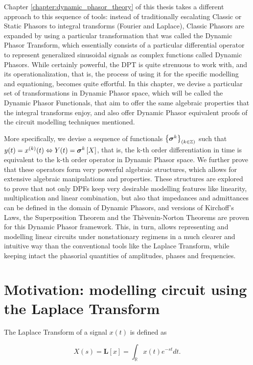 	Chapter \ref{chapter:dynamic_phasor_theory} of this thesis takes a different approach to this sequence of tools: instead of traditionally escalating Classic or Static Phasors to integral transforms (Fourier and Laplace), Classic Phasors are expanded by using a particular transformation that was called the Dynamic Phasor Transform, which essentially consists of a particular differential operator to represent generalized sinusoidal signals as complex functions called Dynamic Phasors. While certainly powerful, the DPT is quite strenuous to work with, and its operationalization, that is, the process of using it for the specific modelling and equationing, becomes quite effortful. In this chapter, we devise a particular set of transformations in Dynamic Phasor space, which will be called the Dynamic Phasor Functionals, that aim to offer the same algebraic properties that the integral transforms enjoy, and also offer Dynamic Phasor equivalent proofs of the circuit modelling techniques mentioned.

	More specifically, we devise a sequence of functionals $\left\{\boldsymbol{\sigma}^{k}\right\}_{(k\in\mathbb{Z})}$ such that $y(t) = x^{(k)}(t)\Leftrightarrow Y(t) = \boldsymbol{\sigma}^{k}\left[X\right]$, that is, the k-th order differentiation in time is equivalent to the k-th order operator in Dynamic Phasor space. We further prove that these operators form very powerful algebraic structures, which allows for extensive algebraic manipulations and properties. These structures are explored to prove that not only DPFs keep very desirable modelling features like linearity, multiplication and linear combination, but also that impedances and admittances can be defined in the domain of Dynamic Phasors, and versions of Kirchoff's Laws, the Superposition Theorem and the Thèvenin-Norton Theorems are proven for this Dynamic Phasor framework. This, in turn, allows representing and modelling linear circuits under nonstationary regimens in a much clearer and intuitive way than the conventional tools like the Laplace Transform, while keeping intact the phasorial quantities of amplitudes, phases and frequencies.

\section{Motivation: modelling circuit using the Laplace Transform}

	The Laplace Transform of a signal $x(t)$ is defined as

\begin{equation} X(s) = \mathbf{L}\left[x\right] = \int_{\mathbb{R}} x(t)e^{-st}dt . \label{eq:laplace_def}\end{equation}

